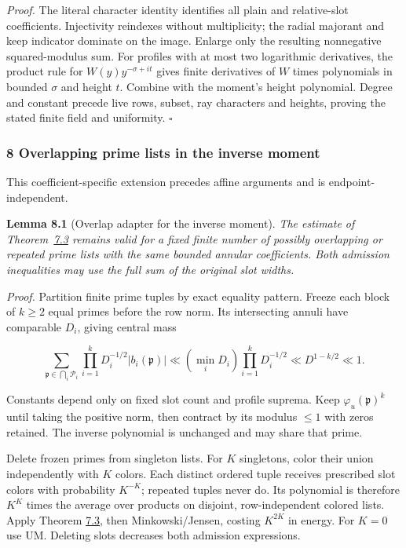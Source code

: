 \emph{Proof.} The literal character identity identifies all plain and relative-slot coefficients. Injectivity reindexes without multiplicity; the radial majorant and keep indicator dominate on the image. Enlarge only the resulting nonnegative squared-modulus sum. For profiles with at most two logarithmic derivatives, the product rule for \(W(y)y^{-\sigma+it}\) gives finite derivatives of \(W\) times polynomials in bounded \(\sigma\) and height \(t\). Combine with the moment's height polynomial. Degree and constant precede live rows, subset, ray characters and heights, proving the stated finite field and uniformity. \(\square\)

\hypertarget{ov:section}{}

\label{ov:section}

\hypertarget{overlapping-prime-lists-in-the-inverse-moment}{%
\subsubsection{8 Overlapping prime lists in the inverse moment}\label{overlapping-prime-lists-in-the-inverse-moment}}

This coefficient-specific extension precedes affine arguments and is endpoint-independent.

\textbf{Lemma 8.1} (Overlap adapter for the inverse moment). \emph{\hypertarget{ov:inverse-overlap}{}\label{ov:inverse-overlap} The estimate of Theorem~\protect\hyperlink{mf:inverse}{7.3} remains valid for a fixed finite number of possibly overlapping or repeated prime lists with the same bounded annular coefficients. Both admission inequalities may use the full sum of the original slot widths.}

\emph{Proof.} Partition finite prime tuples by exact equality pattern. Freeze each block of \(k\ge2\) equal primes before the row norm. Its intersecting annuli have comparable \(D_i\), giving central mass

\[
\sum_{\mathfrak p\in\bigcap_i\mathcal P_i}
       \prod_{i=1}^k D_i^{-1/2}|b_i(\mathfrak p)|
 \ll (\min_iD_i)\prod_{i=1}^k D_i^{-1/2}
 \ll D^{1-k/2}\ll1.
\]

Constants depend only on fixed slot count and profile suprema. Keep \(\varphi_u(\mathfrak p)^k\) until taking the positive norm, then contract by its modulus \(\le1\) with zeros retained. The inverse polynomial is unchanged and may share that prime.

Delete frozen primes from singleton lists. For \(K\) singletons, color their union independently with \(K\) colors. Each distinct ordered tuple receives prescribed slot colors with probability \(K^{-K}\); repeated tuples never do. Its polynomial is therefore \(K^K\) times the average over products on disjoint, row-independent colored lists. Apply Theorem \protect\hyperlink{mf:inverse}{7.3}, then Minkowski/Jensen, costing \(K^{2K}\) in energy. For \(K=0\) use UM. Deleting slots decreases both admission expressions.

